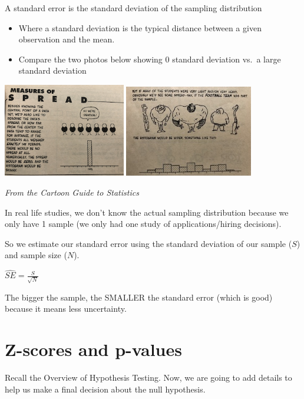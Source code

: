 \documentclass[
  letterpaper,
  DIV=11,
  numbers=noendperiod]{scrreprt}
\providecommand{\tightlist}{%
  \setlength{\itemsep}{0pt}\setlength{\parskip}{0pt}}\usepackage{longtable,booktabs,array}
\begin{document}
A standard error is the standard deviation of the sampling distribution

\begin{itemize}
\tightlist
\item
  Where a standard deviation is the typical distance between a given
  observation and the mean.
\item
  Compare the two photos below showing 0 standard deviation vs.~a large
  standard deviation
\end{itemize}

\includegraphics[width=0.4\textwidth,height=\textheight]{images/spread1.png}
\includegraphics[width=0.42\textwidth,height=\textheight]{images/spread2.jpg}

\emph{From the Cartoon Guide to Statistics}

In real life studies, we don't know the actual sampling distribution
because we only have 1 sample (we only had one study of
applications/hiring decisions).

So we estimate our standard error using the standard deviation of our
sample (\(S\)) and sample size (\(N\)).

\({\hat {SE}} = \frac{S}{\sqrt{N}}\)

The bigger the sample, the SMALLER the standard error (which is good)
because it means less uncertainty.

\hypertarget{z-scores-and-p-values}{%
\section{Z-scores and p-values}\label{z-scores-and-p-values}}

Recall the Overview of Hypothesis Testing. Now, we are going to add
details to help us make a final decision about the null hypothesis.
\end{document}
